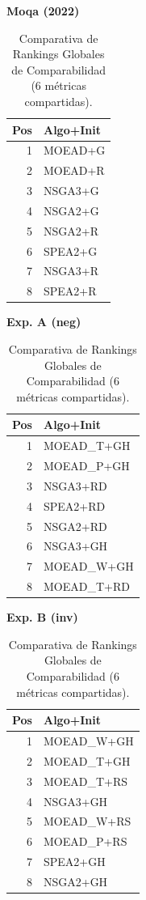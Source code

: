 \documentclass[a4paper,10pt]{article}
\begin{document}
\begin{table}[H]
    \centering
    \begin{minipage}[t]{0.32\textwidth}
        \centering\scriptsize\textbf{Moqa (2022)}\\
        \begin{tabular}{rl}
            \toprule
            Pos & Algo+Init \\ \midrule
            1 & MOEAD+G \\
            2 & MOEAD+R \\
            3 & NSGA3+G \\
            4 & NSGA2+G \\
            5 & NSGA2+R \\
            6 & SPEA2+G \\
            7 & NSGA3+R \\
            8 & SPEA2+R \\
            \bottomrule
        \end{tabular}
    \end{minipage}
    \hfill
    \begin{minipage}[t]{0.32\textwidth}
        \centering\scriptsize\textbf{Exp. A (neg)}\\
        \begin{tabular}{rl}
            \toprule
            Pos & Algo+Init \\ \midrule
            1 & MOEAD\_T+GH \\
            2 & MOEAD\_P+GH \\
            3 & NSGA3+RD \\
            4 & SPEA2+RD \\
            5 & NSGA2+RD \\
            6 & NSGA3+GH \\
            7 & MOEAD\_W+GH \\
            8 & MOEAD\_T+RD \\
            \bottomrule
        \end{tabular}
    \end{minipage}
    \hfill
    \begin{minipage}[t]{0.32\textwidth}
        \centering\scriptsize\textbf{Exp. B (inv)}\\
        \begin{tabular}{rl}
            \toprule
            Pos & Algo+Init \\ \midrule
            1 & MOEAD\_W+GH \\
            2 & MOEAD\_T+GH \\
            3 & MOEAD\_T+RS \\
            4 & NSGA3+GH \\
            5 & MOEAD\_W+RS \\
            6 & MOEAD\_P+RS \\
            7 & SPEA2+GH \\
            8 & NSGA2+GH \\
            \bottomrule
        \end{tabular}
    \end{minipage}
    \caption{Comparativa de Rankings Globales de Comparabilidad (6 métricas compartidas).}
\end{table}
\end{document}
